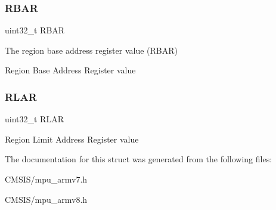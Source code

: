 \subsubsection{\texorpdfstring{RBAR}{RBAR}}
{\footnotesize\ttfamily uint32\+\_\+t R\+B\+AR}



The region base address register value (R\+B\+AR) 

Region Base Address Register value \mbox{\label{struct_a_r_m___m_p_u___region__t_ae9f3dcae5bc76cea6379c01975cc335b}} 
\subsubsection{\texorpdfstring{RLAR}{RLAR}}
{\footnotesize\ttfamily uint32\+\_\+t R\+L\+AR}

Region Limit Address Register value 

The documentation for this struct was generated from the following files\+:\begin{DoxyCompactItemize}
\item 
C\+M\+S\+I\+S/mpu\+\_\+armv7.\+h\item 
C\+M\+S\+I\+S/mpu\+\_\+armv8.\+h\end{DoxyCompactItemize}
